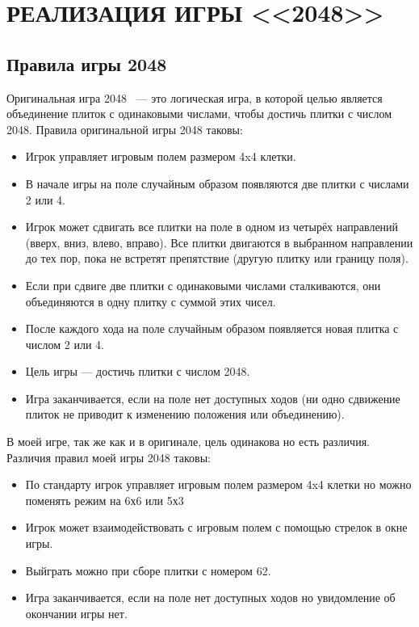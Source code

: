 \chapter{\label{ch:ch02}РЕАЛИЗАЦИЯ ИГРЫ <<2048>>} 

\section{\label{subsec:ch01/sec01/sub01}Правила игры 2048}
Оригинальная игра 2048~\cite{2048} — это логическая игра, в которой целью является объединение плиток с одинаковыми числами, чтобы достичь плитки с числом 2048. Правила оригинальной игры 2048 таковы:
\begin{itemize}
\item Игрок управляет игровым полем размером 4x4 клетки.
\item В начале игры на поле случайным образом появляются две плитки с числами 2 или 4.
\item Игрок может сдвигать все плитки на поле в одном из четырёх направлений (вверх, вниз, влево, вправо). Все плитки двигаются в выбранном направлении до тех пор, пока не встретят препятствие (другую плитку или границу поля).
\item Если при сдвиге две плитки с одинаковыми числами сталкиваются, они объединяются в одну плитку с суммой этих чисел.
\item После каждого хода на поле случайным образом появляется новая плитка с числом 2 или 4.
\item Цель игры — достичь плитки с числом 2048.
\item Игра заканчивается, если на поле нет доступных ходов (ни одно сдвижение плиток не приводит к изменению положения или объединению).
\end{itemize}
В моей игре, так же как и в оригинале, цель одинакова но есть различия. Различия правил моей игры 2048 таковы:
\begin{itemize}
\item По стандарту игрок управляет игровым полем размером 4x4 клетки но можно поменять режим на 6х6 или 5х3
\item Игрок может взаимодействовать с игровым полем с помощью стрелок в окне игры.
\item Выйграть можно при сборе плитки с номером 62.
\item  Игра заканчивается, если на поле нет доступных ходов  но увидомление об окончании игры нет.
\end{itemize}
